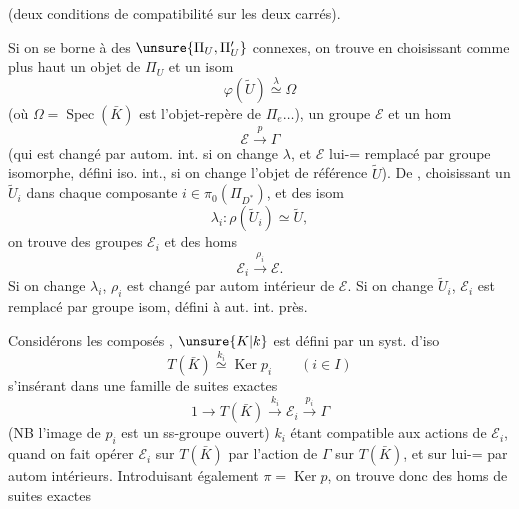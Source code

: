  (deux conditions de compatibilité sur les deux carrés).

Si on  se borne à des $\unsure{\Pi_U,\Pi'_U}$ connexes, on trouve en choisissant comme plus haut un objet  de $\Pi_U$ et un isom
\[
\boxed{\varphi(\widetilde U)\overset{\lambda}{\simeq}\Omega}
\]
(où $\Omega=\operatorname{Spec}(\bar K)$ est l'objet-repère de $\Pi_e\ldots$), un groupe $\mathcal E$ et un hom
\[
\mathcal E\xrightarrow{p}\Gamma
\]
(qui est changé par autom. int. si on change $\lambda$, et $\mathcal E$ lui-= remplacé par groupe isomorphe,  défini  iso. int., si on change l'objet de référence $\widetilde U$). De \unsure{=}, choisissant un $\widetilde U_i$ dans chaque composante $i\in\pi_0(\Pi_{D^*})$, et des isom
\[
\lambda_i:\rho(\widetilde U_i)\simeq\widetilde U,
\]
on trouve des groupes $\mathcal E_i$ et des homs
\[
\mathcal E_i\xrightarrow{\rho_i}\mathcal E.
\]
Si on change $\lambda_i$, $\rho_i$ est changé par autom intérieur de $\mathcal E$. Si on change  $\widetilde U_i$, $\mathcal E_i$ est remplacé par groupe isom, défini à aut. int. près.


Considérons les composés
,  $\unsure{K|k}$ est défini par un syst. d'iso
\[
T(\bar K)\overset{k_i}{\simeq}\operatorname{Ker}p_i\qquad(i\in I)
\]
s'insérant dans une famille de suites exactes
\[
1\longrightarrow T(\bar K)\xrightarrow{k_i}\mathcal E_i\xrightarrow{p_i}\Gamma
\]
(NB l'image de $p_i$ est un ss-groupe ouvert)
$k_i$ étant compatible aux actions de $\mathcal E_i$, quand on fait opérer $\mathcal E_i$ sur $T(\bar K)$ par l'action de $\Gamma$ sur $T(\bar K)$, et sur lui-= par autom intérieurs. Introduisant également $\pi=\operatorname{Ker}p$, on trouve donc des homs de suites exactes

